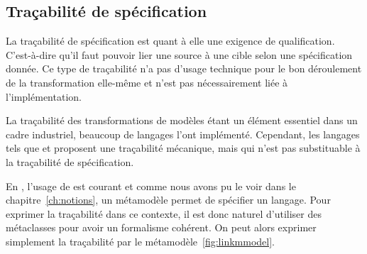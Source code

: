 


\subsection{Traçabilité de spécification}

La traçabilité de spécification est quant à elle une exigence de qualification.
C'est-à-dire qu'il faut pouvoir lier une source à une cible selon une
spécification donnée. Ce type de traçabilité n'a pas d'usage technique pour le
bon déroulement de la transformation elle-même et n'est pas nécessairement liée
à l'implémentation.

La traçabilité des transformations de modèles étant un élément essentiel dans
un cadre industriel, beaucoup de langages l'ont implémenté. Cependant, les
langages tels que {\qvtr} et {\atl} proposent une traçabilité mécanique, mais
qui n'est pas substituable à la traçabilité de spécification.




En {\idm}, l'usage de {\uml} est courant et comme nous avons pu le voir dans le
chapitre~\ref{ch:notions}, un métamodèle permet de spécifier un langage. Pour
exprimer la traçabilité dans ce contexte, il est donc naturel d'utiliser des
métaclasses pour avoir un formalisme cohérent. On peut alors exprimer
simplement la traçabilité par le métamodèle~\ref{fig:linkmmodel}.

